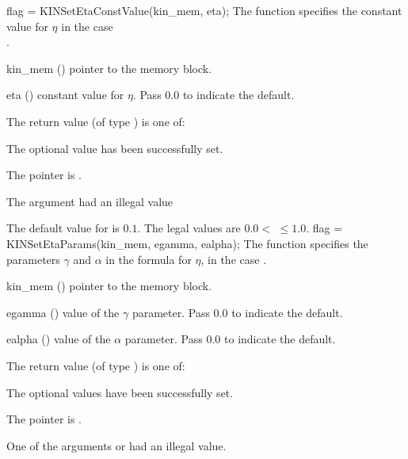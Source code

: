 {
flag = KINSetEtaConstValue(kin\_mem, eta);
}
{
  The function  specifies the constant value
  for $\eta$ in the case \\ .
}
{
  \begin{args}
  \item[kin\_mem] ()
    pointer to the {\kinsol} memory block.
  \item[eta] ()
    constant value for $\eta$.  Pass $0.0$ to indicate the default.
  \end{args}
}
{
  The return value  (of type ) is one of:
  \begin{args}
  \item[\Id{KIN\_SUCCESS}]
    The optional value has been successfully set.
  \item[\Id{KIN\_MEM\_NULL}]
    The  pointer is .
  \item[\Id{KIN\_ILL\_INPUT}]
    The argument  had an illegal value
  \end{args}
}
{
  The default value for  is $0.1$.
  The legal values are $0.0 <$  $\le 1.0$.
}
{
flag = KINSetEtaParams(kin\_mem, egamma, ealpha);
}
{
  The function  specifies the parameters $\gamma$ and
  $\alpha$ in the formula for $\eta$, in the case .
}
{
  \begin{args}
  \item[kin\_mem] ()
    pointer to the {\kinsol} memory block.
  \item[egamma] ()
    value of the $\gamma$ parameter.  Pass $0.0$ to indicate the default.
  \item[ealpha] ()
    value of the $\alpha$ parameter.  Pass $0.0$ to indicate the default.
  \end{args}
}
{
  The return value  (of type ) is one of:
  \begin{args}
  \item[\Id{KIN\_SUCCESS}]
    The optional values have been successfully set.
  \item[\Id{KIN\_MEM\_NULL}]
    The  pointer is .
  \item[\Id{KIN\_ILL\_INPUT}]
    One of the arguments  or  had an illegal value.
  \end{args}
}
